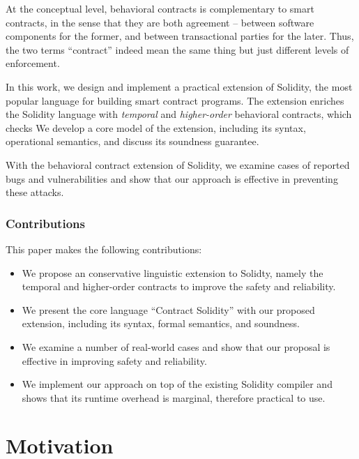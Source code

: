 \documentclass[acmsmall,review,anonymous]{acmart}\settopmatter{printfolios=true,printccs=false,printacmref=false}
\begin{document}

At the conceptual level, behavioral contracts is complementary to smart
contracts, in the sense that they are both agreement -- between software
components for the former, and between transactional parties for the later.
Thus, the two terms ``contract'' indeed mean the same thing but just different
levels of enforcement.

In this work, we design and implement a practical extension of Solidity, the
most popular language for building smart contract programs. The extension
enriches the Solidity language with \emph{temporal} and \emph{higher-order} behavioral
contracts, which checks 
We develop a core model of the extension, including its syntax,
operational semantics, and discuss its soundness guarantee.

With the behavioral contract extension of Solidity, we examine
 cases of reported bugs and vulnerabilities and show that
our approach is effective in preventing these attacks.



\subsubsection*{\textbf{Contributions}} This paper makes the following contributions:
\begin{itemize}
  \item We propose an conservative linguistic extension to Solidty,
    namely the temporal and higher-order contracts to improve the safety and
    reliability.
  \item We present the core language ``Contract Solidity'' with our
    proposed extension, including its syntax, formal semantics, and soundness.
  \item We examine a number of real-world cases and show that our proposal is
    effective in improving safety and reliability.
  \item We implement our approach on top of the existing Solidity compiler and shows
    that its runtime overhead is marginal, therefore practical to use.
\end{itemize}

\section{Motivation}
\end{document}
